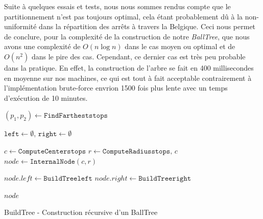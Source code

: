 \documentclass[12pt]{article}
\begin{document}
Suite à quelques essais et tests, nous nous sommes rendus compte que le partitionnement n'est pas toujours optimal, cela étant probablement dû à la non-uniformité dans la répartition des arrêts à
travers la Belgique. Ceci nous permet de conclure, pour la complexité de la construction de notre \emph{BallTree}, que nous avons une complexité de $O(n \log n)$ dans le cas moyen ou optimal et de 
$O(n^2)$ dans le pire des cas. Cependant, ce dernier cas est très peu probable dans la pratique. En effet, la construction de l'arbre se fait en 400 millisecondes en moyenne sur nos machines, ce qui 
est tout à fait acceptable contrairement à l'implémentation brute-force envrion 1500 fois plus lente avec un temps d'exécution de 10 minutes.

\begin{algorithm}[H]
    \footnotesize
    \DontPrintSemicolon
    
    
    $(p_1,p_2)\gets \texttt{FindFarthest}{\texttt{stops}}$\;
    
    $\texttt{left}\gets\emptyset$, \quad $\texttt{right}\gets\emptyset$\;
    
    $c\gets \texttt{ComputeCenter}{\texttt{stops}}$\;
    $r\gets \texttt{ComputeRadius}{\texttt{stops},\,c}$\;
    $node\gets \texttt{InternalNode}(c,r)$\;
    
    $node.\mathit{left}\gets \texttt{BuildTree}{\texttt{left}}$\;
    $node.\mathit{right}\gets \texttt{BuildTree}{\texttt{right}}$\;
    
    \Return $node$\;
    \caption{BuildTree - Construction récursive d'un BallTree}
  \end{algorithm}
  
\end{document}

